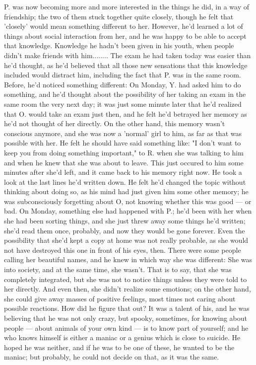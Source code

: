 P. was now becoming more and more interested in the things he did, in a way of friendship; the two of them stuck together quite closely, though he felt that 'closely' would mean something different to her. However, he'd learned a lot of things about social interaction from her, and he was happy to be able to accept that knowledge. Knowledge he hadn't been given in his youth, when people didn't make friends with him........
The exam he had taken today was easier than he'd thought, as he'd believed that all those new sensations that this knowledge included would distract him, including the fact that P. was in the same room. Before, he'd noticed something different: On Monday, Y. had asked him to do something, and he'd thought about the possibility of her taking an exam in the same room the very next day; it was just some minute later that he'd realized that O. would take an exam just then, and he felt he'd betrayed her memory as he'd not thought of her directly. On the other hand, this memory wasn't conscious anymore, and she was now a 'normal' girl to him, as far as that was possible with her. 
He felt he should have said something like: "I don't want to keep you from doing something important," to R. when she was talking to him and when he knew that she was about to leave. This just occured to him some minutes after she'd left, and it came back to his memory right now. 
He took a look at the last lines he'd written down. He felt he'd changed the topic without thinking about doing so, as his mind had just given him some other memory; he was subconsciously forgetting about O, not knowing whether this was good --- or bad. 
On Monday, something else had happened with P.; he'd been with her when she had been sorting things, and she just threw away some things he'd written; she'd read them once, probably, and now they would be gone forever. Even the possibility that she'd kept a copy at home was not really probable, as she would not have destroyed this one in front of his eyes, then. There were some people calling her beautiful names, and he knew in which way she was different: She was into society, and at the same time, she wasn't. That is to say, that she was completely integrated, but she was not to notice things unless they were told to her directly. And even then, she didn't realize some emotions; on the other hand, she could give away masses of positive feelings, most times not caring about possible reactions. 
How did he figure that out? It was a talent of his, and he was believing that he was not only crazy, but spooky, sometimes, for knowing about people --- about animals of your own kind --- is to know part of yourself; and he who knows himself is either a maniac or a genius which is close to suicide. He hoped he was neither, and if he was to be one of these, he wanted to be the maniac; but probably, he could not decide on that, as it was the same. 
